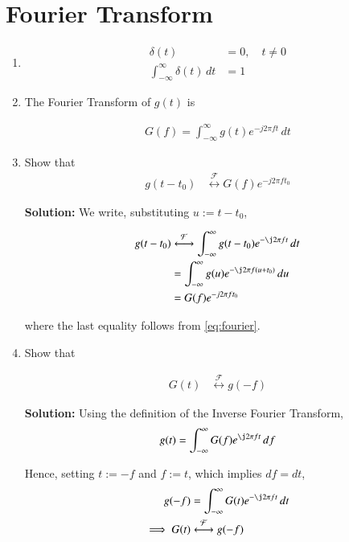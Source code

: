 \documentclass[journal,12pt,twocolumn]{IEEEtran}
\newcommand{\solution}{\noindent \textbf{Solution: }}
\providecommand{\system}[1]{\overset{\mathcal{#1}}{ \longleftrightarrow}}
\numberwithin{equation}{section}
\numberwithin{figure}{section}
\renewcommand\thesection{\arabic{section}}
\begin{document}
\section{Fourier Transform}

\begin{enumerate}[label=\thesection.\arabic*
,ref=\thesection.\theenumi]
\item 

\begin{align}
	\delta(t)&=0, \quad t\neq 0 \\
	\int_{-\infty}^{\infty}\delta(t) \, dt&= 1
\end{align}

\item The Fourier Transform of $g(t)$ is

\begin{align}
G(f)=\int_{-\infty}^{\infty}g(t)e^{-j2\pi ft}\,dt
\label{eq:fourier}
\end{align}

\item Show that 
\begin{align}
    g(t-t_0)&\system{F}G(f)e^{-j2\pi ft_0}
    \label{eq:t-shift}
\end{align}

\solution We write, substituting $u := t-t_0$,

\begin{align}
    g(t-t_0)&\system{F}\int_{-\infty}^{\infty}
            g(t-t_0)e^{-\j2\pi ft}\,dt \\
            &=\int_{-\infty}^{\infty}
            g(u)e^{-\j2\pi f(u + t_0)}\,du \\
            &=G(f)e^{-j2\pi ft_0}
\end{align}

where the last equality follows from \eqref{eq:fourier}.
\item Show that

\begin{align}
    G(t)&\system{F}g(-f)
\end{align}

\solution Using the definition of the Inverse Fourier Transform,
\begin{align}
    g(t)=\int_{-\infty}^{\infty}G(f)e^{\j2\pi ft}\,df
    \label{eq:duality}
\end{align}

Hence, setting $t := -f$ and $f := t$, which implies $df = dt$,
\begin{align}
    g(-f)&=\int_{-\infty}^{\infty}G(t)e^{-\j2\pi ft}\,dt \\
    \implies G(t)&\system{F}g(-f)
\end{align}


\end{enumerate}
\end{document}
